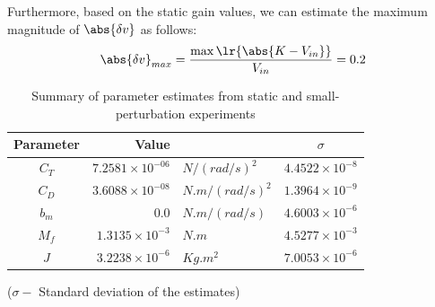 Furthermore, based on the static gain values, we can estimate the maximum magnitude of $\abs{\delta v}$ as follows:
\begin{align}
    \abs{\delta v}_{max} = \frac{ \max\lr{\abs{K - V_{in}}}}{V_{in}} = 0.2
\end{align}
\begin{table}[h]
    \centering
    \caption{\centering Summary of parameter estimates from static and small-perturbation experiments}
    \label{tab::parm_ests}
    \begin{tabular}{c r l c}
        \hline \hline
        Parameter & Value & & $\sigma$           \\ \hline \hline
        $C_T$ & $7.2581 \times 10^{-06}$ & $N/(rad/s)^2$   & $4.4522 \times 10^{-8}$ \\
        $C_D$ & $3.6088 \times 10^{-08}$ & $N.m/(rad/s)^2$ & $1.3964 \times 10^{-9}$ \\
        $b_m$ & $0.0$                    & $N.m/(rad/s)$   & $4.6003 \times 10^{-6}$  \\
        $M_f$ & $1.3135 \times 10^{-3}$  & $N.m$           & $4.5277 \times 10^{-3}$ \\
        $J$   & $3.2238 \times 10^{-6}$   & $Kg.m^2$        & $7.0053 \times 10^{-6}$ \\
        \hline \hline
    \end{tabular}
    \begin{flushleft}
        ($\sigma - $ Standard deviation of the estimates)
    \end{flushleft}
\end{table}
